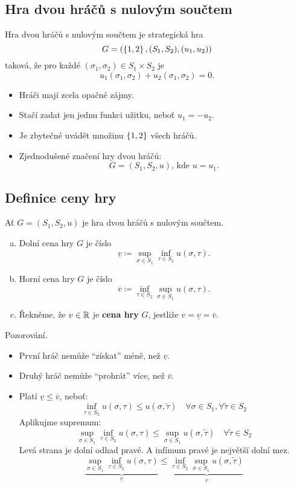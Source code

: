 \subsection{Hra dvou hráčů s nulovým součtem}
Hra dvou hráčů s nulovým součtem je strategická hra
\[
    G = (\left\lbrace 1,2 \right\rbrace, (S_1, S_2), (u_1, u_2))
\]
taková, že pro každé $(\sigma_1, \sigma_2) \in S_1 \times S_2$ je
\[
    u_1(\sigma_1, \sigma_2) + u_2(\sigma_1, \sigma_2) = 0.
\]
\begin{itemize}
    \item Hráči mají zcela opačné zájmy.
    \item Stačí zadat jen jednu funkci užitku, neboť $u_1 = -u_2$.
    \item Je zbytečné uvádět množinu $\left\lbrace 1,2 \right\rbrace$ všech hráčů.
    \item Zjednodušené značení hry dvou hráčů:
    \[G = (S_1, S_2, u) \text{, kde } u = u_1.\]
\end{itemize}

\subsection{Definice ceny hry}
Ať $G = (S_1, S_2, u)$ je hra dvou hráčů s nulovým součtem.
\begin{enumerate}[(a)]
    \item Dolní cena hry $G$ je číslo
    \[\underline{v} \coloneqq \sup_{\sigma \in S_1} \inf_{\tau \in S_2} u(\sigma, \tau).\]
    \item Horní cena hry $G$ je číslo
    \[\overline{v} \coloneqq \inf_{\tau \in S_2} \sup_{\sigma \in S_1} u(\sigma, \tau).\]
    \item Řekněme, že $v \in \mathbb{R}$ je \textbf{cena hry} $G$, jestliže $v = \underline{v} = \overline{v}$.
\end{enumerate}
Pozorování.
\begin{itemize}
    \item První hráč nemůže \enquote{získat} méně, než $\underline{v}$.
    \item Druhý hráč nemůže \enquote{prohrát} více, než $\overline{v}$.
    \item Platí $\underline{v} \leq \overline{v}$, neboť:
    \[
        \inf_{\tau \in S_2} u(\sigma, \tau) \leq u(\sigma, \tilde{\tau}) \quad \forall \sigma \in S_1, 
        \forall \tilde{\tau} \in S_2
    \]
    Aplikujme supremum:
    \[  
        \sup_{\sigma \in S_1} \inf_{\tau \in S_2} u(\sigma, \tau) \leq \sup_{\sigma \in S_1} u(\sigma, \tilde{\tau}) 
        \quad \forall \tilde{\tau} \in S_2
    \]
    Levá strana je dolní odhad pravé. A infímum pravé je největší dolní mez.
    \[
        \underbrace{\sup_{\sigma \in S_1} \inf_{\tau \in S_2} u(\sigma, \tau)}_{\underline{v}} \leq 
        \underbrace{\inf_{\tau \in S_2} \sup_{\sigma \in S_1} u(\sigma, \tilde{\tau})}_{\overline{v}}
    \]
\end{itemize}

